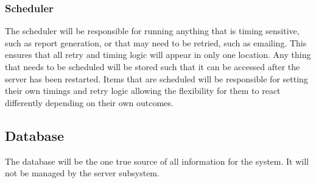 \subsubsection{Scheduler}
\par
The scheduler will be responsible for running anything that is timing sensitive, such as report generation, or that may need to be retried, such as emailing. This ensures that all retry and timing logic will appear in only one location. Any thing that needs to be scheduled will be stored such that it can be accessed after the server has been restarted. Items that are scheduled will be responsible for setting their own timings and retry logic allowing the flexibility for them to react differently depending on their own outcomes.

\subsection{Database}
\par
The database will be the one true source of all information for the system. It will not be managed by the server subsystem.

